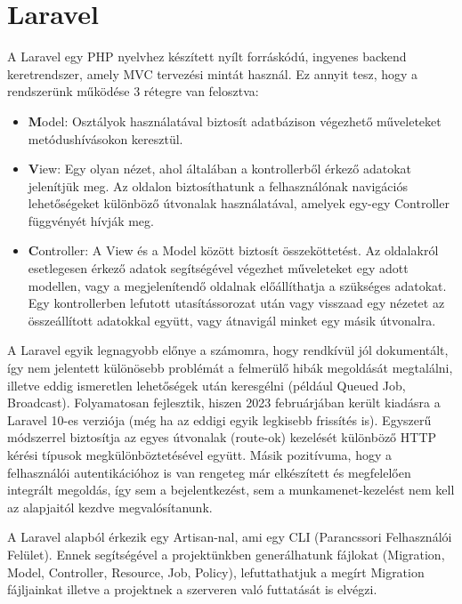 \documentclass[
]{thesis-ekf}
\theoremstyle{definition}
\theoremstyle{remark}
\begin{document}
	   \section{Laravel}
	       A Laravel\cite{LaravelMVC} egy PHP nyelvhez készített nyílt forráskódú,  ingyenes backend keretrendszer, amely MVC tervezési mintát használ.
            Ez annyit tesz, hogy a rendszerünk működése 3 rétegre van felosztva:
            \begin{itemize}
                \item \textbf{M}odel: Osztályok használatával biztosít adatbázison végezhető műveleteket metódushívásokon keresztül.
                \item \textbf{V}iew: Egy olyan nézet, ahol általában a kontrollerből érkező adatokat jelenítjük meg. Az oldalon biztosíthatunk a felhasználónak navigációs lehetőségeket különböző útvonalak használatával, amelyek egy-egy Controller függvényét hívják meg.
                \item \textbf{C}ontroller: A View és a Model között biztosít összeköttetést. Az oldalakról esetlegesen érkező adatok segítségével végezhet műveleteket egy adott modellen, vagy a megjelenítendő oldalnak előállíthatja a szükséges adatokat. Egy kontrollerben lefutott utasítássorozat után vagy visszaad egy nézetet az összeállított adatokkal együtt, vagy átnavigál minket egy másik útvonalra.
                
            \end{itemize}
            A Laravel egyik legnagyobb előnye a számomra, hogy rendkívül jól dokumentált, így nem jelentett különösebb problémát a felmerülő hibák megoldását megtalálni, illetve eddig ismeretlen lehetőségek után keresgélni (például Queued Job, Broadcast). Folyamatosan fejlesztik, hiszen 2023 februárjában került kiadásra a Laravel 10-es verziója (még ha az eddigi egyik legkisebb frissítés is). Egyszerű módszerrel biztosítja az egyes útvonalak (route-ok) kezelését különböző HTTP kérési típusok megkülönböztetésével együtt. Másik pozitívuma, hogy a felhasználói autentikációhoz is van rengeteg már elkészített és megfelelően integrált megoldás, így sem a bejelentkezést, sem a munkamenet-kezelést nem kell az alapjaitól kezdve megvalósítanunk.
            
            A Laravel alapból érkezik egy Artisan-nal, ami egy CLI (Parancssori Felhasználói Felület). Ennek segítségével a projektünkben generálhatunk fájlokat (Migration, Model, Controller, Resource, Job, Policy), lefuttathatjuk a megírt Migration fájljainkat illetve a projektnek a szerveren való futtatását is elvégzi.
	
\end{document}
